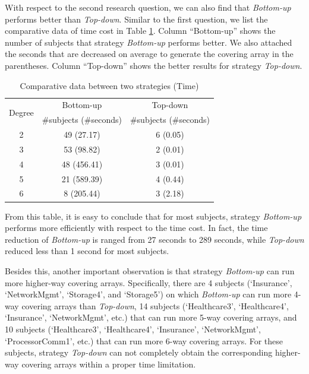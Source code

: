 \documentclass[conference]{IEEEtran}
\theoremstyle{definition}
\begin{document}
With respect to the second research question, we can also find that \emph{Bottom-up} performs better than \emph{Top-down}. Similar to the first question, we list the comparative data of time cost in Table \ref{statistic_of_subjects_time}.  Column ``Bottom-up'' shows the number of subjects that strategy \emph{Bottom-up} performs better. We also attached the seconds that are decreased on average to generate the covering array in the parentheses.  Column ``Top-down'' shows the better results for strategy \emph{Top-down}.

\begin{table}[!ht]
\caption{Comparative data between two strategies (Time) }
\label{statistic_of_subjects_time}
\center
    \begin{tabular}{|c|c|c|} \hline
\multirow{2}{*}{Degree} & Bottom-up & Top-down \\\cline{2-3}
 & \#subjects (\#seconds) & \#subjects (\#seconds) \\\hline
2 & 49 (27.17) & 6 (0.05) \\
3 & 53 (98.82) & 2 (0.01) \\
4 & 48 (456.41) & 3 (0.01) \\
5 & 21 (589.39) & 4 (0.44) \\
6 & 8 (205.44) & 3 (2.18)  \\ \hline
    \end{tabular}%
\end{table}

From this table, it is easy to conclude that for most subjects, strategy \emph{Bottom-up} performs more efficiently with respect to the time cost. In fact, the time reduction of \emph{Bottom-up} is ranged from 27 seconds to 289 seconds, while \emph{Top-down} reduced less than 1 second for most subjects.

Besides this, another important observation is that strategy \emph{Bottom-up} can run more higher-way covering arrays. Specifically, there are 4 subjects (`Insurance', `NetworkMgmt', `Storage4', and  `Storage5') on which \emph{Bottom-up} can run more 4-way covering arrays than \emph{Top-down}, 14 subjects (`Healthcare3', `Healthcare4', `Insurance', `NetworkMgmt', etc.) that can run more 5-way covering arrays, and 10 subjects (`Healthcare3', `Healthcare4', `Insurance', `NetworkMgmt', `ProcessorComm1', etc.) that can run more 6-way covering arrays. For these subjects, strategy \emph{Top-down} can not completely obtain the corresponding higher-way covering arrays within a proper time limitation.
\end{document}
